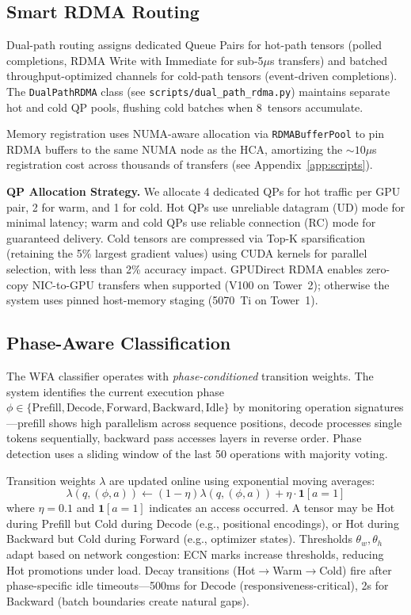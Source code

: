 \documentclass[11pt,letterpaper]{article}
\theoremstyle{definition}
\begin{document}
\subsection{Smart RDMA Routing}

Dual-path routing assigns dedicated Queue Pairs for hot-path tensors (polled completions, RDMA Write with Immediate for sub-5$\mu$s transfers) and batched throughput-optimized channels for cold-path tensors (event-driven completions). The \texttt{DualPathRDMA} class (see \texttt{scripts/dual\_path\_rdma.py}) maintains separate hot and cold QP pools, flushing cold batches when 8~tensors accumulate.

Memory registration uses NUMA-aware allocation via \texttt{RDMABufferPool} to pin RDMA buffers to the same NUMA node as the HCA, amortizing the ${\sim}10\mu$s registration cost across thousands of transfers (see Appendix~\ref{app:scripts}).

\textbf{QP Allocation Strategy.} We allocate 4 dedicated QPs for hot traffic per GPU pair, 2 for warm, and 1 for cold. Hot QPs use unreliable datagram (UD) mode for minimal latency; warm and cold QPs use reliable connection (RC) mode for guaranteed delivery. Cold tensors are compressed via Top-K sparsification (retaining the 5\% largest gradient values) using CUDA kernels for parallel selection, with less than 2\% accuracy impact. GPUDirect RDMA enables zero-copy NIC-to-GPU transfers when supported (V100 on Tower~2); otherwise the system uses pinned host-memory staging (5070~Ti on Tower~1).

\subsection{Phase-Aware Classification}

The WFA classifier operates with \emph{phase-conditioned} transition weights. The system identifies the current execution phase $\phi \in \{\text{Prefill}, \text{Decode}, \text{Forward}, \text{Backward}, \text{Idle}\}$ by monitoring operation signatures---prefill shows high parallelism across sequence positions, decode processes single tokens sequentially, backward pass accesses layers in reverse order. Phase detection uses a sliding window of the last 50 operations with majority voting.

Transition weights $\lambda$ are updated online using exponential moving averages:
\begin{equation}
    \lambda(q, (\phi, a)) \leftarrow (1-\eta)\lambda(q, (\phi, a)) + \eta \cdot \mathbf{1}[a = 1]
\end{equation}
where $\eta = 0.1$ and $\mathbf{1}[a=1]$ indicates an access occurred. A tensor may be Hot during Prefill but Cold during Decode (e.g., positional encodings), or Hot during Backward but Cold during Forward (e.g., optimizer states). Thresholds $\theta_w, \theta_h$ adapt based on network congestion: ECN marks increase thresholds, reducing Hot promotions under load. Decay transitions (Hot$\to$Warm$\to$Cold) fire after phase-specific idle timeouts---500ms for Decode (responsiveness-critical), 2s for Backward (batch boundaries create natural gaps).
\end{document}
